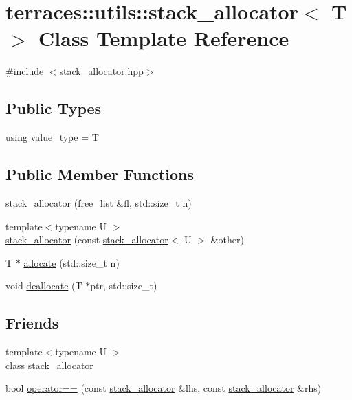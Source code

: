 \hypertarget{classterraces_1_1utils_1_1stack__allocator}{}\section{terraces\+:\+:utils\+:\+:stack\+\_\+allocator$<$ T $>$ Class Template Reference}
\label{classterraces_1_1utils_1_1stack__allocator}


{\ttfamily \#include $<$stack\+\_\+allocator.\+hpp$>$}

\subsection*{Public Types}
\begin{DoxyCompactItemize}
\item 
using \hyperlink{classterraces_1_1utils_1_1stack__allocator_a1c3fa04869c7fe9730a18b046461cbbb}{value\+\_\+type} = T
\end{DoxyCompactItemize}
\subsection*{Public Member Functions}
\begin{DoxyCompactItemize}
\item 
\hyperlink{classterraces_1_1utils_1_1stack__allocator_a557138c2f8f21847dbbfbdc588909f68}{stack\+\_\+allocator} (\hyperlink{classterraces_1_1utils_1_1free__list}{free\+\_\+list} \&fl, std\+::size\+\_\+t n)
\item 
{\footnotesize template$<$typename U $>$ }\\\hyperlink{classterraces_1_1utils_1_1stack__allocator_a786655b3258a2c776901389ca5c1c762}{stack\+\_\+allocator} (const \hyperlink{classterraces_1_1utils_1_1stack__allocator}{stack\+\_\+allocator}$<$ U $>$ \&other)
\item 
T $\ast$ \hyperlink{classterraces_1_1utils_1_1stack__allocator_afcc195b71e290468330bf444ab27a237}{allocate} (std\+::size\+\_\+t n)
\item 
void \hyperlink{classterraces_1_1utils_1_1stack__allocator_a804f63d9b9f82e5462dae9a43144ec82}{deallocate} (T $\ast$ptr, std\+::size\+\_\+t)
\end{DoxyCompactItemize}
\subsection*{Friends}
\begin{DoxyCompactItemize}
\item 
{\footnotesize template$<$typename U $>$ }\\class \hyperlink{classterraces_1_1utils_1_1stack__allocator_a63e83703d59c04427b11c879b4f4a637}{stack\+\_\+allocator}
\item 
bool \hyperlink{classterraces_1_1utils_1_1stack__allocator_a4f03647bb7adb25d049daf9e4e741301}{operator==} (const \hyperlink{classterraces_1_1utils_1_1stack__allocator}{stack\+\_\+allocator} \&lhs, const \hyperlink{classterraces_1_1utils_1_1stack__allocator}{stack\+\_\+allocator} \&rhs)
\end{DoxyCompactItemize}


